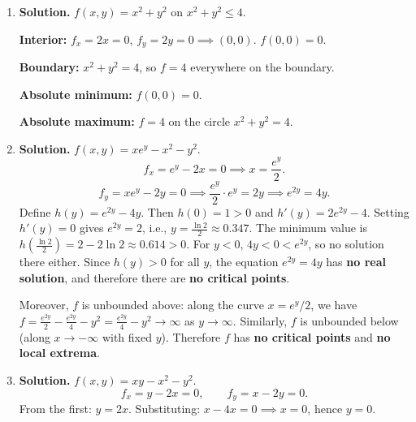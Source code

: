 \begin{enumerate}
So the only critical point is $(0,0)$.

Second derivatives: $f_{xx} = 2y$, $f_{yy} = -2y$, $f_{xy} = 2x$.

At $(0,0)$: $f_{xx} = 0$, $f_{yy} = 0$, $f_{xy} = 0$. $D = 0$: \textbf{inconclusive}.

Examine $f$ directly: $f(x,0) = 0$ for all $x$, $f(0,y) = -y^3/3$ (changes sign), and $f(\epsilon,\epsilon) = \epsilon^3 - \epsilon^3/3 = 2\epsilon^3/3$ (changes sign). Since $f$ takes both positive and negative values near $(0,0)$, and $f(0,0) = 0$, the origin is a \textbf{saddle point}.

\item \textbf{Solution.}
$f(x,y) = x^2 + y^2$ on $x^2 + y^2 \leq 4$.

\textbf{Interior:} $f_x = 2x = 0$, $f_y = 2y = 0 \implies (0,0)$. $f(0,0) = 0$.

\textbf{Boundary:} $x^2 + y^2 = 4$, so $f = 4$ everywhere on the boundary.

\textbf{Absolute minimum:} $f(0,0) = \boxed{0}$.

\textbf{Absolute maximum:} $f = \boxed{4}$ on the circle $x^2 + y^2 = 4$.

\item \textbf{Solution.}
$f(x,y) = xe^y - x^2 - y^2$.
\[
f_x = e^y - 2x = 0 \implies x = \frac{e^y}{2}.
\]
\[
f_y = xe^y - 2y = 0 \implies \frac{e^y}{2}\cdot e^y = 2y \implies e^{2y} = 4y.
\]
Define $h(y) = e^{2y} - 4y$. Then $h(0) = 1 > 0$ and $h'(y) = 2e^{2y} - 4$. Setting $h'(y) = 0$ gives $e^{2y} = 2$, i.e., $y = \frac{\ln 2}{2} \approx 0.347$. The minimum value is $h(\tfrac{\ln 2}{2}) = 2 - 2\ln 2 \approx 0.614 > 0$. For $y < 0$, $4y < 0 < e^{2y}$, so no solution there either. Since $h(y) > 0$ for all $y$, the equation $e^{2y} = 4y$ has \textbf{no real solution}, and therefore there are \textbf{no critical points}.

Moreover, $f$ is unbounded above: along the curve $x = e^y/2$, we have $f = \frac{e^{2y}}{2} - \frac{e^{2y}}{4} - y^2 = \frac{e^{2y}}{4} - y^2 \to \infty$ as $y \to \infty$. Similarly, $f$ is unbounded below (along $x \to -\infty$ with fixed $y$). Therefore $f$ has \textbf{no critical points} and \textbf{no local extrema}.

\item \textbf{Solution.}
$f(x,y) = xy - x^2 - y^2$.
\[
f_x = y - 2x = 0, \qquad f_y = x - 2y = 0.
\]
From the first: $y = 2x$. Substituting: $x - 4x = 0 \implies x = 0$, hence $y = 0$.


\end{enumerate}
